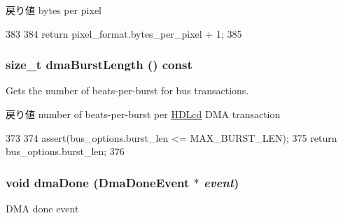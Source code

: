 \begin{DoxyReturn}{戻り値}
bytes per pixel 
\end{DoxyReturn}



\begin{DoxyCode}
383                                         {
384         return pixel_format.bytes_per_pixel + 1;
385     }
\end{DoxyCode}
\hypertarget{classHDLcd_addfe179a028990a8ef8df5d347b5b7a9}{
\subsubsection[{dmaBurstLength}]{\setlength{\rightskip}{0pt plus 5cm}size\_\-t dmaBurstLength () const}}
\label{classHDLcd_addfe179a028990a8ef8df5d347b5b7a9}
Gets the number of beats-\/per-\/burst for bus transactions.

\begin{DoxyReturn}{戻り値}
number of beats-\/per-\/burst per \hyperlink{classHDLcd}{HDLcd} DMA transaction 
\end{DoxyReturn}



\begin{DoxyCode}
373                                          {
374         assert(bus_options.burst_len <= MAX_BURST_LEN);
375         return bus_options.burst_len;
376     }
\end{DoxyCode}
\hypertarget{classHDLcd_aa86bef1e89693640a33feac9f6871f35}{
\subsubsection[{dmaDone}]{\setlength{\rightskip}{0pt plus 5cm}void dmaDone ({\bf DmaDoneEvent} $\ast$ {\em event})}}
\label{classHDLcd_aa86bef1e89693640a33feac9f6871f35}
DMA done event 


